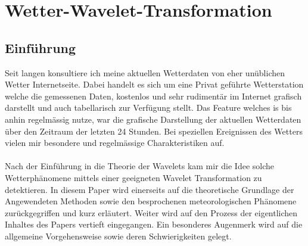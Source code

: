 %
%
%
\chapter{Wetter-Wavelet-Transformation\label{chapter:wwt}}
\begin{refsection}



\lstset{style=mystyle}


\section{Einführung}


Seit langen konsultiere ich meine aktuellen Wetterdaten von eher unüblichen Wetter Internetseite.
Dabei handelt es sich um eine Privat geführte Wetterstation welche die gemessenen Daten, kostenlos und sehr rudimentär im Internet grafisch darstellt und auch tabellarisch zur Verfügung stellt.
Das Feature welches is bis anhin regelmässig nutze, war die grafische Darstellung der aktuellen Wetterdaten über den Zeitraum der letzten 24 Stunden.
Bei speziellen Ereignissen des Wetters vielen mir besondere und regelmässige Charakteristiken auf.
\\
\\
Nach der Einführung in die Theorie der Wavelets kam mir die Idee solche Wetterphänomene mittels einer geeigneten Wavelet Transformation zu detektieren.
In diesem Paper wird einerseits auf die theoretische Grundlage der Angewendeten Methoden sowie den besprochenen meteorologischen Phänomene zurückgegriffen und kurz erläutert. 
Weiter wird auf den Prozess der eigentlichen Inhaltes des Papers vertieft eingegangen. Ein besonderes Augenmerk wird auf die allgemeine Vorgehensweise sowie deren Schwierigkeiten gelegt.
\\





\end{refsection}
